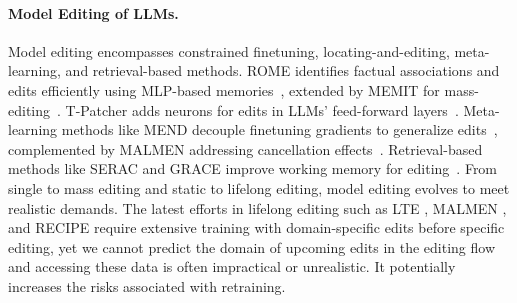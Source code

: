 \documentclass{article}
\begin{document}
\paragraph{Model Editing of LLMs.}
Model editing encompasses constrained finetuning, locating-and-editing, meta-learning, and retrieval-based methods.
ROME identifies factual associations and edits efficiently using MLP-based memories~\cite{rome}, extended by MEMIT for mass-editing~\cite{memit}. T-Patcher adds neurons for edits in LLMs' feed-forward layers~\cite{t-patcher}. Meta-learning methods like MEND decouple finetuning gradients to generalize edits~\cite{mend}, complemented by MALMEN addressing cancellation effects~\cite{malmen}. Retrieval-based methods like SERAC and GRACE improve working memory for editing~\cite{serac,grace}. From single to mass editing and static to lifelong editing, model editing evolves to meet realistic demands.
The latest efforts in lifelong editing such as LTE \cite{lte}, MALMEN \cite{malmen}, and RECIPE \cite{recipe} require extensive training with domain-specific edits before specific editing, yet we cannot predict the domain of upcoming edits in the editing flow and accessing these data is often impractical or unrealistic.
It potentially increases the risks associated with retraining.
\end{document}
